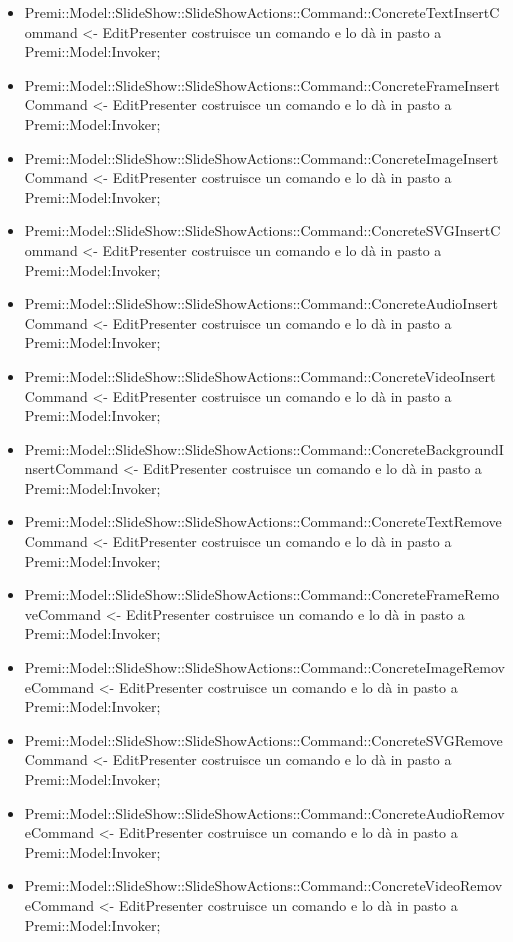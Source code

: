 {{\begin{itemize}
			\item Premi::Model::SlideShow::SlideShowActions::Command::ConcreteTextInsertCommand <- EditPresenter costruisce un comando e lo dà in pasto a Premi::Model:Invoker;
			\item Premi::Model::SlideShow::SlideShowActions::Command::ConcreteFrameInsertCommand <- EditPresenter costruisce un comando e lo dà in pasto a Premi::Model:Invoker;
			\item Premi::Model::SlideShow::SlideShowActions::Command::ConcreteImageInsertCommand <- EditPresenter costruisce un comando e lo dà in pasto a Premi::Model:Invoker;
			\item Premi::Model::SlideShow::SlideShowActions::Command::ConcreteSVGInsertCommand <- EditPresenter costruisce un comando e lo dà in pasto a Premi::Model:Invoker;
			\item Premi::Model::SlideShow::SlideShowActions::Command::ConcreteAudioInsertCommand <- EditPresenter costruisce un comando e lo dà in pasto a Premi::Model:Invoker;
			\item Premi::Model::SlideShow::SlideShowActions::Command::ConcreteVideoInsertCommand <- EditPresenter costruisce un comando e lo dà in pasto a Premi::Model:Invoker;
			\item Premi::Model::SlideShow::SlideShowActions::Command::ConcreteBackgroundInsertCommand <- EditPresenter costruisce un comando e lo dà in pasto a Premi::Model:Invoker;
			\item Premi::Model::SlideShow::SlideShowActions::Command::ConcreteTextRemoveCommand <- EditPresenter costruisce un comando e lo dà in pasto a Premi::Model:Invoker;
			\item Premi::Model::SlideShow::SlideShowActions::Command::ConcreteFrameRemoveCommand <- EditPresenter costruisce un comando e lo dà in pasto a Premi::Model:Invoker;
			\item Premi::Model::SlideShow::SlideShowActions::Command::ConcreteImageRemoveCommand <- EditPresenter costruisce un comando e lo dà in pasto a Premi::Model:Invoker;
			\item Premi::Model::SlideShow::SlideShowActions::Command::ConcreteSVGRemoveCommand <- EditPresenter costruisce un comando e lo dà in pasto a Premi::Model:Invoker;
			\item Premi::Model::SlideShow::SlideShowActions::Command::ConcreteAudioRemoveCommand <- EditPresenter costruisce un comando e lo dà in pasto a Premi::Model:Invoker;
			\item Premi::Model::SlideShow::SlideShowActions::Command::ConcreteVideoRemoveCommand <- EditPresenter costruisce un comando e lo dà in pasto a Premi::Model:Invoker;

\end{itemize}}}
